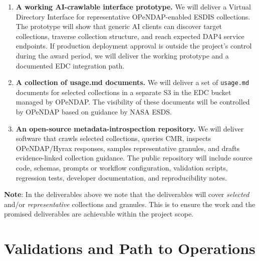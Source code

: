 \documentclass[11pt]{article}
\begin{document}
\begin{enumerate}
\item \textbf{A working \ac{AI}-crawlable interface prototype.} We will deliver
a Virtual Directory Interface for representative \acs{OPeNDAP}-enabled
\ac{ESDIS} collections. The prototype will show that generic
\ac{AI} clients can discover target collections, traverse collection structure,
and reach expected \ac{DAP4} service endpoints. If production deployment
approval is outside the project's control during the award period, we will
deliver the working prototype and a documented \ac{EDC} integration path.

\item \textbf{A collection of usage.md documents.} We will deliver
a set of \texttt{usage.md} documents for selected collections in a separate S3
in the \ac{EDC} bucket managed by \ac{OPeNDAP}. The visibility of these
documents will be controlled by \ac{OPeNDAP} based on guidance by NASA \ac{ESDS}.

\item \textbf{An open-source metadata-introspection repository.} We will deliver
software that crawls selected collections, queries \ac{CMR}, inspects
\acs{OPeNDAP}/Hyrax responses, samples representative granules, and drafts
evidence-linked collection guidance. The public repository will include source
code, schemas, prompts or workflow configuration, validation scripts, regression
tests, developer documentation, and reproducibility notes.


\end{enumerate}

\textbf{Note}: In the deliverables above we note that the deliverables will
cover {\em selected} and/or {\em representative} collections and granules. This
is to ensure the work and the promised deliverables are achievable within the
project scope. 

\section{Validations and Path to Operations}
\end{document}

